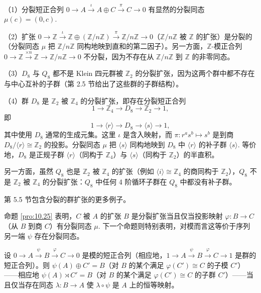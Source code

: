 \begin{example}
（1）分裂短正合列 \(0 \to A \xrightarrow{\iota} A \oplus C \xrightarrow{\pi} C \to 0\) 有显然的分裂同态 \(\mu(c) = (0, c)\).

（2）扩张 \(0 \to \mathbb{Z} \xrightarrow{\iota} \mathbb{Z} \oplus (\mathbb{Z}/n\mathbb{Z}) \xrightarrow{\pi} \mathbb{Z}/n\mathbb{Z} \to 0\)（\(\mathbb{Z}/n\mathbb{Z}\) 被 \(\mathbb{Z}\) 的扩张）是分裂的（分裂同态 \(\mu\) 把 \(\mathbb{Z}/n\mathbb{Z}\) 同构地映到直和的第二因子）。另一方面，\(\mathbb{Z}\)-模正合列 \(0 \to \mathbb{Z} \xrightarrow{\times n} \mathbb{Z} \to \mathbb{Z}/n\mathbb{Z} \to 0\) 不分裂，因为不存在从 \(\mathbb{Z}/n\mathbb{Z}\) 到 \(\mathbb{Z}\) 的非零同态。

（3）\(D_8\) 与 \(Q_8\) 都不是 Klein 四元群被 \(\mathbb{Z}_2\) 的分裂扩张，因为这两个群中都不存在与中心互补的子群（第 2.5 节给出了这些群的子群结构）。

（4）群 \(D_8\) 是 \(\mathbb{Z}_2\) 被 \(\mathbb{Z}_4\) 的分裂扩张，即存在分裂短正合列
\[
1 \longrightarrow \mathbb{Z}_4 \longrightarrow D_8 \longrightarrow \mathbb{Z}_2 \longrightarrow 1,
\]
即
\[
1 \longrightarrow \langle r \rangle \longrightarrow D_8 \longrightarrow \langle s \rangle \longrightarrow 1,
\]
其中使用 \(D_8\) 通常的生成元集。这里 \(\iota\) 是含入映射，而 \(\pi : r^as^b \mapsto s^b\) 是到商 \(D_8/\langle r \rangle \cong \mathbb{Z}_2\) 的投影。分裂同态 \(\mu\) 把 \(\langle s \rangle\) 同构地映到 \(D_8\) 中 \(\langle r \rangle\) 的补子群 \(\langle s \rangle\). 等价地，\(D_8\) 是正规子群 \(\langle r \rangle\)（同构于 \(\mathbb{Z}_4\)）与 \(\langle s \rangle\)（同构于 \(\mathbb{Z}_2\)）的半直积。

另一方面，虽然 \(Q_8\) 也是 \(\mathbb{Z}_2\) 被 \(\mathbb{Z}_4\) 的扩张（例如 \(\langle i \rangle \cong \mathbb{Z}_4\) 的商同构于 \(\mathbb{Z}_2\)），\(Q_8\) 不是 \(\mathbb{Z}_2\) 被 \(\mathbb{Z}_4\) 的分裂扩张：\(Q_8\) 中任何 4 阶循环子群在 \(Q_8\) 中都没有补子群。

第 5.5 节包含分裂的群扩张的更多例子。
\end{example}

命题 \ref{pro:10.25} 表明，\(C\) 被 \(A\) 的扩张 \(B\) 是分裂扩张当且仅当投影映射 \(\varphi : B \to C\)（从 \(B\) 到商 \(C\)）有分裂同态 \(\mu\). 下一个命题则特别表明，对模而言这等价于序列另一端 \(\psi\) 存在分裂同态。

\begin{proposition}\label{pro:10.26}
设 \(0 \to A \xrightarrow{\psi} B \xrightarrow{\varphi} C \to 0\) 是模的短正合列（相应地，\(1 \to A \xrightarrow{\psi} B \xrightarrow{\varphi} C \to 1\) 是群的短正合列）。则 \(\psi(A) \oplus C' = B\)（对 \(B\) 的某个满足 \(\varphi(C') \cong C\) 的子模 \(C'\)）——相应地 \(\psi(A) \rtimes C' = B\)（对 \(B\) 的某个满足 \(\varphi(C') \cong C\) 的子群 \(C'\)）——当且仅当存在同态 \(\lambda : B \to A\) 使 \(\lambda \circ \psi\) 是 \(A\) 上的恒等映射。
\end{proposition}

